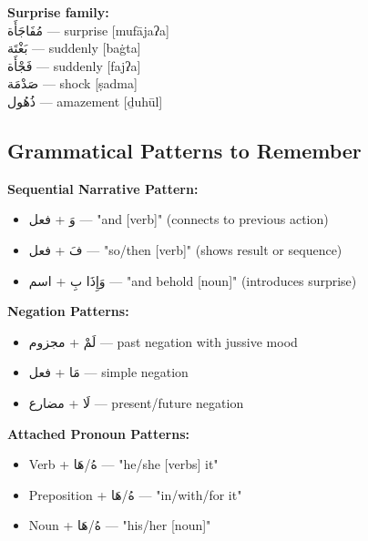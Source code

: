 \documentclass[letter,12pt]{article}
\begin{document}
\begin{multicols}{2}
\textbf{Surprise family:}\\
\textarabic{مُفَاجَأَة} — surprise [mufājaʔa]\\
\textarabic{بَغْتَة} — suddenly [baġta]\\
\textarabic{فَجْأَة} — suddenly [fajʔa]\\
\textarabic{صَدْمَة} — shock [ṣadma]\\
\textarabic{ذُهُول} — amazement [ḏuhūl]
\end{multicols}

\subsection{Grammatical Patterns to Remember}

\textbf{Sequential Narrative Pattern:}
\begin{itemize}
\item \textarabic{وَ + فعل} — "and [verb]" (connects to previous action)
\item \textarabic{فَ + فعل} — "so/then [verb]" (shows result or sequence)
\item \textarabic{وَإِذَا بِ + اسم} — "and behold [noun]" (introduces surprise)
\end{itemize}

\textbf{Negation Patterns:}
\begin{itemize}
\item \textarabic{لَمْ + مجزوم} — past negation with jussive mood
\item \textarabic{مَا + فعل} — simple negation
\item \textarabic{لَا + مضارع} — present/future negation
\end{itemize}

\textbf{Attached Pronoun Patterns:}
\begin{itemize}
\item Verb + \textarabic{هُ/هَا} — "he/she [verbs] it"
\item Preposition + \textarabic{هُ/هَا} — "in/with/for it"
\item Noun + \textarabic{هُ/هَا} — "his/her [noun]"
\end{itemize}
\end{document}
